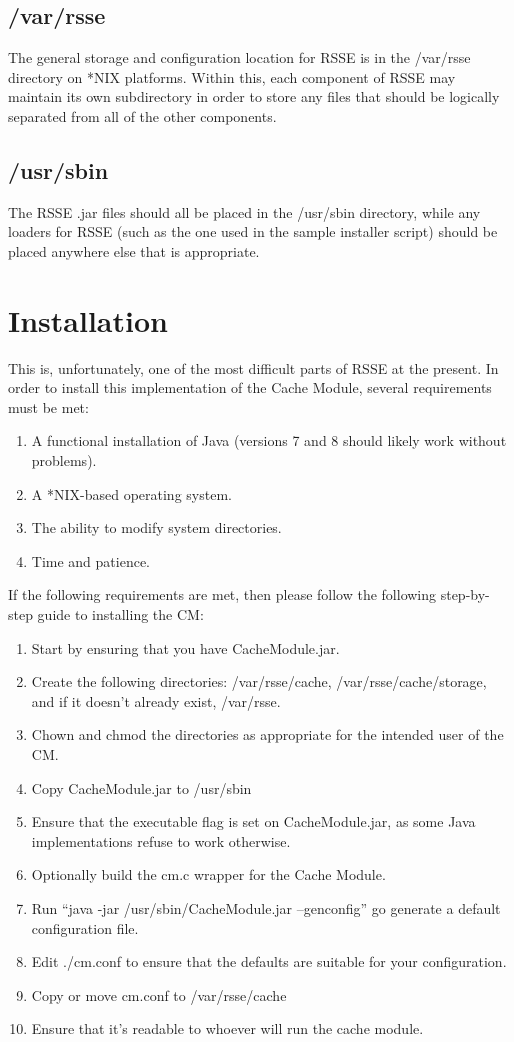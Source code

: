 \documentclass[letterpaper]{article}
\begin{document}
\subsection{/var/rsse}
The general storage and configuration location for RSSE is in the /var/rsse directory on *NIX platforms. Within this, each component of RSSE may maintain its own subdirectory in order to store any files that should be logically separated from all of the other components.

\subsection{/usr/sbin} 
The RSSE .jar files should all be placed in the /usr/sbin directory, while any loaders for RSSE (such as the one used in the sample installer script) should be placed anywhere else that is appropriate.

\section{Installation}
This is, unfortunately, one of the most difficult parts of RSSE at the present. In order to install this implementation of the Cache Module, several requirements must be met:

\begin{enumerate}
   \item A functional installation of Java (versions 7 and 8 should likely work without problems).
   \item A *NIX-based operating system.
   \item The ability to modify system directories.
   \item Time and patience.
\end{enumerate}

If the following requirements are met, then please follow the following step-by-step guide to installing the CM:

\begin{enumerate}
   \item Start by ensuring that you have CacheModule.jar.
   \item Create the following directories: /var/rsse/cache, /var/rsse/cache/storage, and if it doesn't already exist, /var/rsse.
   \item Chown and chmod the directories as appropriate for the intended user of the CM.
   \item Copy CacheModule.jar to /usr/sbin
   \item Ensure that the executable flag is set on CacheModule.jar, as some Java implementations refuse to work otherwise.
   \item Optionally build the cm.c wrapper for the Cache Module.
   \item Run ``java -jar /usr/sbin/CacheModule.jar --genconfig'' go generate a default configuration file.
   \item Edit ./cm.conf to ensure that the defaults are suitable for your configuration.
   \item Copy or move cm.conf to /var/rsse/cache
   \item Ensure that it's readable to whoever will run the cache module.
\end{enumerate}
\end{document}
